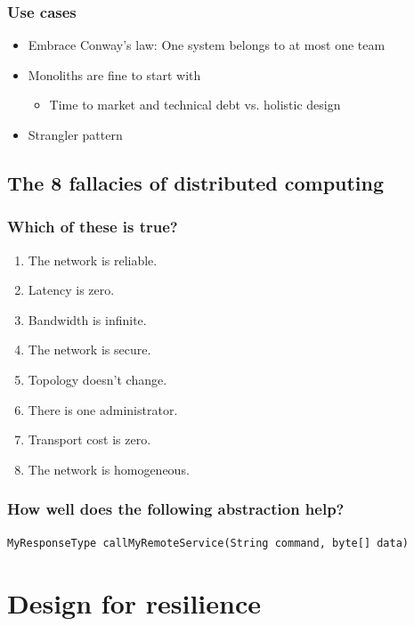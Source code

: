 \documentclass[8pt]{article}
\begin{document}
\subsubsection{Use cases}
\label{sec:orgb96f164}
\begin{itemize}
\item Embrace Conway's law: One system belongs to at most one team
\item Monoliths are fine to start with
\begin{itemize}
\item Time to market and technical debt vs. holistic design
\end{itemize}
\item Strangler pattern
\end{itemize}
\subsection{The 8 fallacies of distributed computing}
\label{sec:org0187cfa}
\subsubsection{Which of these is true?}
\label{sec:orgd5aa137}

\begin{enumerate}
\item The network is reliable.
\item Latency is zero.
\item Bandwidth is infinite.
\item The network is secure.
\item Topology doesn't change.
\item There is one administrator.
\item Transport cost is zero.
\item The network is homogeneous.
\end{enumerate}

\subsubsection{How well does the following abstraction help?}
\label{sec:org17df039}

\begin{verbatim}
MyResponseType callMyRemoteService(String command, byte[] data)
\end{verbatim}

\section{Design for resilience}
\label{sec:org985ba67}
\end{document}
